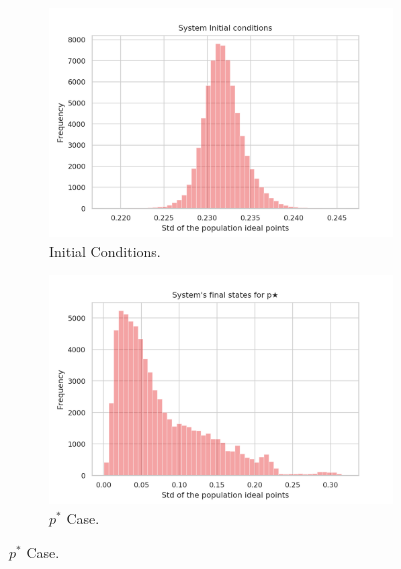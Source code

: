 \documentclass{article}
\begin{document}
\begin{figure}[H]
  \centering
  
    \begin{subfigure}[b]{0.49\textwidth}
      \includegraphics[width=\textwidth]{img/initstd.png}
\caption{Initial Conditions.}
    \end{subfigure}
    \begin{subfigure}[b]{0.49\textwidth}
      \includegraphics[width=\textwidth]{img/Ystd*.png}
 \caption{\(p^*\) Case.}
     \end{subfigure}


\end{figure}
\end{document}
